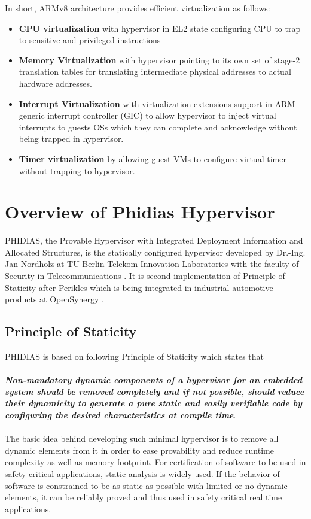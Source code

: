In short, ARMv8 architecture provides efficient virtualization as follows:
\begin{itemize}
	\item \textbf{CPU virtualization} with hypervisor in EL2 state configuring CPU to trap to sensitive and privileged instructions
	\item \textbf{Memory Virtualization} with hypervisor pointing to its own set of stage-2 translation tables for translating intermediate physical addresses to actual hardware addresses.
	\item \textbf{Interrupt Virtualization} with virtualization extensions support in ARM generic interrupt controller (GIC) to allow hypervisor to inject virtual interrupts to guests OSs which they can complete and acknowledge without being trapped in hypervisor.
	\item \textbf{Timer virtualization} by allowing guest VMs to configure virtual timer without trapping to hypervisor.
\end{itemize}

\section{Overview of Phidias Hypervisor \label{sec:summ}}
PHIDIAS, the Provable Hypervisor with Integrated Deployment Information and Allocated Structures, is the statically configured hypervisor developed by Dr.-Ing. Jan Nordholz at TU Berlin Telekom Innovation Laboratories with the faculty of Security in Telecommunications \cite{Jan}. It is second implementation of Principle of Staticity after Perikles which is being integrated in industrial automotive products at OpenSynergy \cite{opensynergy}.
\subsection{Principle of Staticity}
PHIDIAS is based on following Principle of Staticity which states that \\
\\
\textbf{\textit{Non-mandatory dynamic components of a hypervisor for an embedded system should be removed completely and if not possible, should reduce their dynamicity to generate a pure static and easily verifiable code by configuring the desired characteristics at compile time}}.\\
\\
The basic idea behind developing such minimal hypervisor is to remove all dynamic elements from it in order to ease provability and reduce runtime complexity as well as memory footprint. For certification of software to be used in safety critical applications, static analysis is widely used. If the behavior of software is constrained to be as static as possible with limited or no dynamic elements, it can be reliably proved and thus used in safety critical real time applications.
